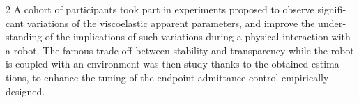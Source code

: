 \documentclass[french,12pt,a4paper]{book}
\begin{document}
\begin{mdframed}[linecolor=Prune,linewidth=1]
\begin{english}
\begin{multicols}{2}
A cohort of participants took part in experiments proposed to observe significant variations of the viscoelastic apparent parameters, and improve the understanding of the implications of such variations during a physical interaction with a robot.
The famous trade-off between stability and transparency while the robot is coupled with an environment was then study thanks to the obtained estimations, to enhance the tuning of the endpoint admittance control empirically designed. 

\end{multicols}
\end{english}
\end{mdframed}
\end{document}
